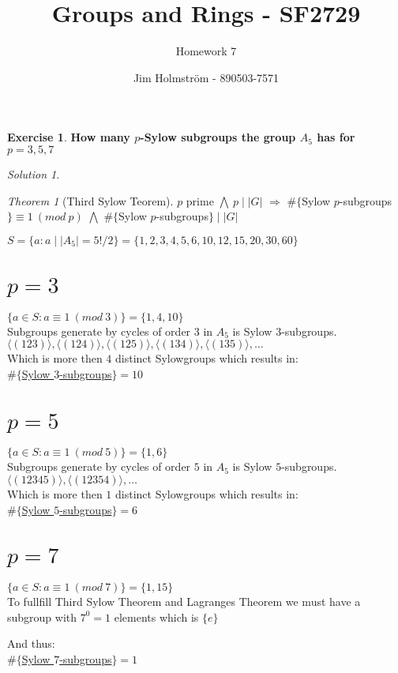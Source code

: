 \documentclass[a4paper,twoside=false,abstract=false,numbers=noenddot,
titlepage=false,headings=small,parskip=half,version=last]{scrartcl}
\author{Jim Holmström - 890503-7571}
\title{Groups and Rings - SF2729}
\subtitle{Homework 7}
\theoremstyle{definition}
\newtheorem{exercise}{Exercise}
\theoremstyle{remark}
\newtheorem*{solution}{Solution}
\newtheorem{theorem}{Theorem}[section]
\begin{document}
\maketitle
\thispagestyle{empty}

\begin{exercise}
{\bf
How many $p$-Sylow subgroups the group $A_5$ has for $p=3,5,7$
}
\end{exercise}
\begin{solution}

\begin{theorem}[Third Sylow Teorem]
   $p$ prime $\bigwedge \: p \mid |G|$ 
   $\Rightarrow$
   $\#\{$Sylow $p$-subgroups$\} \equiv 1 \:( mod \: p)$
   $\bigwedge$
   $\#\{$Sylow $p$-subgroups$\} \mid |G|$ 
\end{theorem}

$S=\{a : a \mid |A_5|=5!/2\}=\{1,2,3,4,5,6,10,12,15,20,30,60\}$

\section{$p=3$}
$\{ a \in S: a \equiv 1 \:(mod\: 3) \}=\{1,4,10\}$\\
Subgroups generate by cycles of order $3$ in $A_5$ is Sylow $3$-subgroups.\\
$\langle (123) \rangle, \langle (124) \rangle, \langle (125) \rangle,
 \langle (134) \rangle, \langle (135) \rangle, \ldots $ \\
Which is more then $4$ distinct Sylowgroups which results in:\\ 
\underline{
    $\#\{$Sylow $3$-subgroups$\}=10$    
}

\section{$p=5$}
$\{ a \in S: a \equiv 1 \:(mod\: 5) \}=\{1,6\}$\\
Subgroups generate by cycles of order $5$ in $A_5$ is Sylow $5$-subgroups.\\
$\langle (12345) \rangle, \langle (12354) \rangle, \ldots $\\
Which is more then $1$ distinct Sylowgroups which results in:\\ 
\underline{
    $\#\{$Sylow $5$-subgroups$\}=6$    
}

\section{$p=7$}
$\{ a \in S: a \equiv 1 \:(mod\: 7) \}=\{1,15\}$\\

To fullfill Third Sylow Theorem and Lagranges Theorem we must have a subgroup with $7^0=1$ elements which is $\{e\}$


And thus:\\
\underline{
    $\#\{$Sylow $7$-subgroups$\}=1$    
}

\end{solution}

\end{document}
